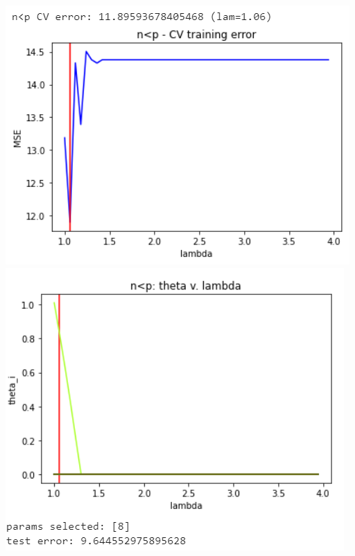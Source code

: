 \documentclass[11pt]{article}
\begin{document}
\begin{center}
\includegraphics[scale=0.7]{charts/ridge_exp_ortho_n_lt_p_err.PNG}
\includegraphics[scale=0.7]{charts/ridge_exp_ortho_n_lt_p_thetas.PNG}


\end{center}
\end{document}
